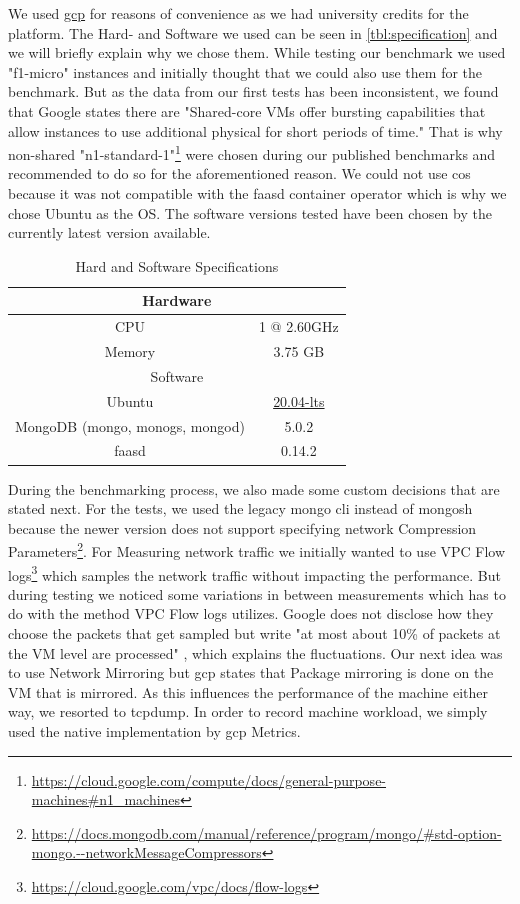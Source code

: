 \documentclass[conference]{IEEEtran}
\begin{document}
We used \href{https://cloud.google.com/}{\acl{gcp}} for reasons of convenience as we had university credits for the platform. 
The Hard- and Software we used can be seen in \autoref{tbl:specification} and we will briefly explain why we chose them.
While testing our benchmark we used "f1-micro" instances and initially thought that we could also use them for the benchmark. But as the data from our first tests has been inconsistent, we found that Google states there are "Shared-core VMs offer bursting capabilities that allow instances to use additional physical for short periods of time." \cite{Google2021General-purposeDocumentation} 
That is why non-shared "n1-standard-1"\footnote{\url{https://cloud.google.com/compute/docs/general-purpose-machines\#n1_machines}} were chosen during our published benchmarks and recommended to do so for the aforementioned reason.
We could not use \ac{cos} because it was not compatible with the faasd container operator which is why we chose Ubuntu as the OS. The software versions tested have been chosen by the currently latest version available. 

\begin{table}[!h]
\caption{Hard and Software Specifications}
\centering
\begin{tabular}{|c|c|}
   \hline
   \multicolumn{2}{|c|}{Hardware} \\ \hline
   CPU & 1 @ 2.60GHz \\
   Memory & 3.75 GB \\ \hline
    \multicolumn{2}{|c|}{Software} \\ \hline
    Ubuntu & \href{https://cloud.google.com/compute/docs/images/os-details#ubuntu_lts}{20.04-lts} \\ 
    MongoDB (mongo, monogs, mongod) & 5.0.2 \\
    faasd & 0.14.2 \\ \hline
\end{tabular}
\label{tbl:specification}
\end{table}

During the benchmarking process, we also made some custom decisions that are stated next. 
For the tests, we used the legacy mongo cli instead of mongosh because the newer version does not support specifying network Compression Parameters\footnote{ \url{https://docs.mongodb.com/manual/reference/program/mongo/\#std-option-mongo.--networkMessageCompressors}}.
For Measuring network traffic we initially wanted to use VPC Flow logs\footnote{\url{https://cloud.google.com/vpc/docs/flow-logs}} which samples the network traffic without impacting the performance. But during testing we noticed some variations in between measurements which has to do with the method VPC Flow logs utilizes. Google does not disclose how they choose the packets that get sampled but write "at most about 10\% of packets at the VM level are processed" \cite{VPCCloud}, which explains the fluctuations. Our next idea was to use Network Mirroring but \ac{gcp} states that Package mirroring is done on the VM that is mirrored. As this influences the performance of the machine either way, we resorted to tcpdump.  
In order to record machine workload, we simply used the native implementation by \ac{gcp} Metrics.
\end{document}
